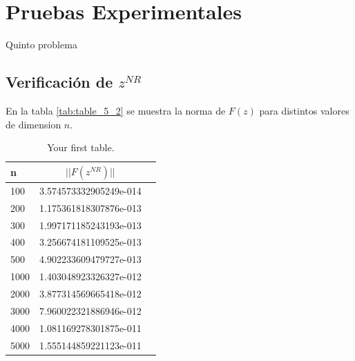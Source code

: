 \documentclass{endm}
\begin{document}
\subsection{}

\subsection{}

\subsection{}

\subsection{}

\section{Pruebas Experimentales}
Quinto problema

\subsection{}

\subsection{Verificación de $z^{NR}$}
En la tabla \ref{tab:table_5_2} se muestra la norma de $F(z)$ para distintos valores de dimension $n$.

\begin{table}[h!]
    \begin{center}
      \caption{Your first table.}
      \label{tab:table1}
      \begin{tabular}{l|c|r} %
        \textbf{n} & \textbf{$||F(z^{NR})||$}\\
        \hline
         100 & 3.574573332905249e-014\\
         200 & 1.175361818307876e-013\\
         300 & 1.997171185243193e-013\\
         400 & 3.256674181109525e-013\\
         500 & 4.902233609479727e-013\\
        1000 & 1.403048923326327e-012\\
        2000 & 3.877314569665418e-012\\
        3000 & 7.960022321886946e-012\\
        4000 & 1.081169278301875e-011\\
        5000 & 1.555144859221123e-011\\
        \hline
      \end{tabular}
    \end{center}
  \end{table}  
\end{document}
